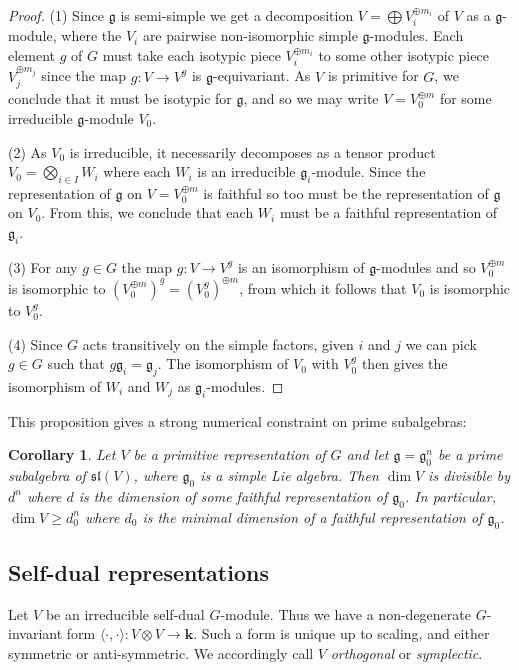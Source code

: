 \documentclass{amsart}
\newtheorem{corollary}[theorem]{Corollary}
\theoremstyle{definition}
\theoremstyle{remark}
\def\fieldk{\mathbf{k}}
\let\mf\mathfrak
\begin{document}
\begin{proof}
(1) Since $\mf{g}$ is semi-simple we get a decomposition $V=\bigoplus V_i^{\oplus m_i}$ of $V$ as a $\mf{g}$-module,
where the $V_i$ are pairwise non-isomorphic simple $\mf{g}$-modules.  Each element $g$ of $G$ must take each isotypic
piece $V_i^{\oplus m_i}$ to some other isotypic piece $V_j^{\oplus m_j}$ since the map $g:V \to V^g$ is
$\mf{g}$-equivariant.  As $V$ is primitive for $G$, we conclude that it must be isotypic for $\mf{g}$, and so we may
write $V=V_0^{\oplus m}$ for some irreducible $\mf{g}$-module $V_0$.

(2) As $V_0$ is irreducible, it necessarily decomposes as a tensor product $V_0=\bigotimes_{i \in I} W_i$ where each
$W_i$ is an irreducible $\mf{g}_i$-module.  Since the representation of $\mf{g}$ on $V=V_0^{\oplus m}$ is faithful so
too must be the representation of $\mf{g}$ on $V_0$.  From this, we conclude that each $W_i$ must be a faithful
representation of $\mf{g}_i$.

(3) For any $g \in G$ the map $g:V \to V^g$ is an isomorphism of $\mf{g}$-modules and so $V_0^{\oplus m}$ is isomorphic
to $(V_0^{\oplus m})^g =(V_0^g)^{\oplus m}$, from which it follows that $V_0$ is isomorphic to $V_0^g$.

(4) Since $G$ acts transitively on the simple factors, given $i$ and $j$ we can pick $g \in G$ such that $g \mf{g}_i=
\mf{g}_j$.  The isomorphism of $V_0$ with $V_0^g$ then gives the isomorphism of $W_i$ and $W_j$ as $\mf{g}_i$-modules.
\end{proof}

This proposition gives a strong numerical constraint on prime subalgebras:

\begin{corollary}
\label{cor:prime-constraint}
Let $V$ be a primitive representation of $G$ and let $\mf{g}=\mf{g}_0^n$ be a prime subalgebra of $\mf{sl}(V)$, where
$\mf{g}_0$ is a simple Lie algebra.  Then $\dim{V}$ is divisible by $d^n$ where $d$ is the dimension of some faithful
representation of $\mf{g}_0$.  In particular, $\dim{V} \ge d_0^n$ where $d_0$ is the minimal dimension of a faithful
representation of $\mf{g}_0$.
\end{corollary}


\subsection{Self-dual representations}

Let $V$ be an irreducible self-dual $G$-module.  Thus we have a non-degenerate $G$-invariant form $\langle \cdot ,
\cdot  \rangle:V \otimes V \to \fieldk$.  Such a form is unique up to scaling, and either symmetric or anti-symmetric.
We accordingly call $V$ \emph{orthogonal} or \emph{symplectic}.
\end{document}
